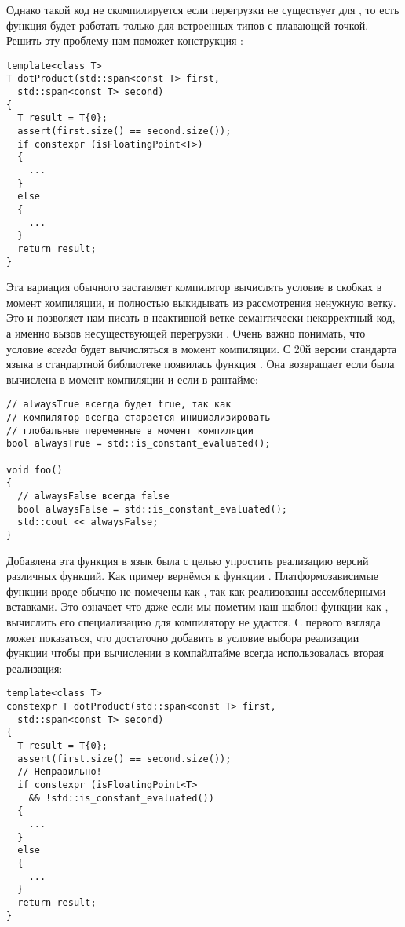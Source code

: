 Однако такой код не скомпилируется если перегрузки  не существует для , то есть функция будет работать только для встроенных типов с плавающей точкой.
Решить эту проблему нам поможет конструкция :
\begin{verbatim}
template<class T>
T dotProduct(std::span<const T> first,
  std::span<const T> second)
{
  T result = T{0};
  assert(first.size() == second.size());
  if constexpr (isFloatingPoint<T>)
  {
    ...
  }
  else
  {
    ...
  }
  return result;
}
\end{verbatim}
Эта вариация обычного  заставляет компилятор вычислять условие в скобках в момент компиляции, и полностью выкидывать из рассмотрения ненужную ветку.
Это и позволяет нам писать в неактивной ветке семантически некорректный код, а именно вызов несуществующей перегрузки .
Очень важно понимать, что условие \textit{всегда} будет вычисляться в момент компиляции.
С 20й версии стандарта языка в стандартной библиотеке появилась функция .
Она возвращает  если была вычислена в момент компиляции и  если в рантайме:
\begin{verbatim}
// alwaysTrue всегда будет true, так как
// компилятор всегда старается инициализировать
// глобальные переменные в момент компиляции
bool alwaysTrue = std::is_constant_evaluated();

void foo()
{
  // alwaysFalse всегда false
  bool alwaysFalse = std::is_constant_evaluated();
  std::cout << alwaysFalse;
}
\end{verbatim}
Добавлена эта функция в язык была с целью упростить реализацию  версий различных функций.
Как пример вернёмся к функции .
Платформозависимые функции вроде  обычно не помечены как , так как реализованы ассемблерными вставками.
Это означает что даже если мы пометим наш шаблон функции  как , вычислить его специализацию для  компилятору не удастся.
С первого взгляда может показаться, что достаточно добавить в условие выбора реализации функции  чтобы при вычислении  в компайлтайме всегда использовалась вторая реализация:
\begin{verbatim}
template<class T>
constexpr T dotProduct(std::span<const T> first,
  std::span<const T> second)
{
  T result = T{0};
  assert(first.size() == second.size());
  // Неправильно!
  if constexpr (isFloatingPoint<T>
    && !std::is_constant_evaluated())
  {
    ...
  }
  else
  {
    ...
  }
  return result;
}
\end{verbatim}
